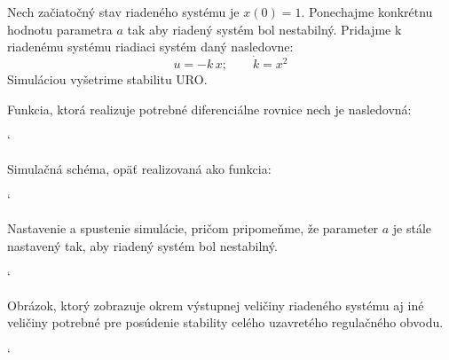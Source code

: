 \documentclass[a4paper, 10pt, ]{article}
\begin{document}
Nech začiatočný stav riadeného systému je $x(0) = 1$. Ponechajme konkrétnu hodnotu parametra $a$ tak aby riadený systém bol nestabilný. Pridajme k riadenému systému riadiaci systém daný nasledovne:
	\begin{equation}
		u = -k\, x; \qquad \dot{k} = x^2
	\end{equation}
Simuláciou vyšetrime stabilitu URO.


\noindent
Funkcia, ktorá realizuje potrebné diferenciálne rovnice nech je nasledovná:


{\catcode`

}

\noindent
Simulačná schéma, opäť realizovaná ako funkcia:

{\catcode`

}


\noindent
Nastavenie a spustenie simulácie, pričom pripomeňme, že parameter $a$ je stále nastavený tak, aby riadený systém bol nestabilný.

{\catcode`

}

\noindent
Obrázok, ktorý zobrazuje okrem výstupnej veličiny riadeného systému aj iné veličiny potrebné pre posúdenie stability celého uzavretého regulačného obvodu.


{\catcode`

}



\begin{centering}


    \vspace{-2mm}

    \figcaption{}

    \vspace{2mm}

    \label{figsc_ar02_fig01_1}

\end{centering}
\end{document}
